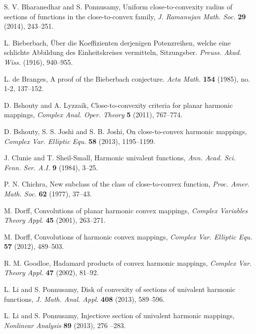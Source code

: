 \documentclass[a4paper,12pt]{amsart}
\theoremstyle{plain}
\theoremstyle{definition}
\begin{document}
\begin{thebibliography}{99}

{\sc S. V. Bharanedhar} and {\sc S. Ponnusamy}, Uniform close-to-convexity radius of sections of functions in the close-to-convex
family, {\it J. Ramanujan Math. Soc.} {\bf 29} (2014), 243--251.

{\sc L. Bieberbach}, \"{U}ber die Koeffizienten derjenigen
Potenzreihen, welche eine schlichte Abbildung des Einheitskreises
vermitteln, Sitzungsber. {\it Preuss. Akad. Wiss.} (1916), 940--955.

{\sc L. de Branges}, A proof of the Bieberbach conjecture. {\it Acta
Math.} {\bf 154} (1985), no. 1-2, 137--152.

{\sc D. Bshouty} and {\sc A. Lyzzaik}, Close-to-convexity criteria for planar harmonic mappings, {\it  Complex Anal. Oper. Theory} {\bf 5} (2011), 767--774.

{\sc D. Bshouty, S. S. Joshi} and {\sc S. B. Joshi}, On close-to-convex harmonic mappings, {\it Complex Var. Elliptic Equ.} {\bf 58} (2013), 1195--1199.

{\sc J. Clunie} and {\sc T. Sheil-Small}, Harmonic univalent functions, {\it Ann. Acad. Sci. Fenn. Ser. A.I.} {\bf 9} (1984), 3--25.

{\sc P. N. Chichra}, New subclass of the class of close-to-convex function, {\it Proc. Amer. Math. Soc.} {\bf 62} (1977), 37--43.

{\sc M. Dorff}, Convolutions of planar harmonic convex mappings, {\it Complex Variables Theory Appl.} {\bf 45} (2001), 263--271.

{\sc M. Dorff}, Convolutions of harmonic convex mappings, {\it Complex Var. Elliptic Equ.} {\bf 57} (2012), 489--503.

{\sc R. M. Goodloe}, Hadamard products of convex harmonic mappings, {\it Complex Var. Theory Appl.} {\bf 47} (2002), 81--92.

{\sc L. Li} and {\sc S. Ponnusamy}, Disk of convexity of sections of univalent harmonic functions, {\it J. Math. Anal. Appl.} {\bf 408} (2013), 589--596.

{\sc L. Li} and {\sc S. Ponnusamy}, Injectiove section of univalent harmonic mappings, {\it Nonlinear Analysis} {\bf 89} (2013), 276 --283.


\end{thebibliography}
\end{document}
